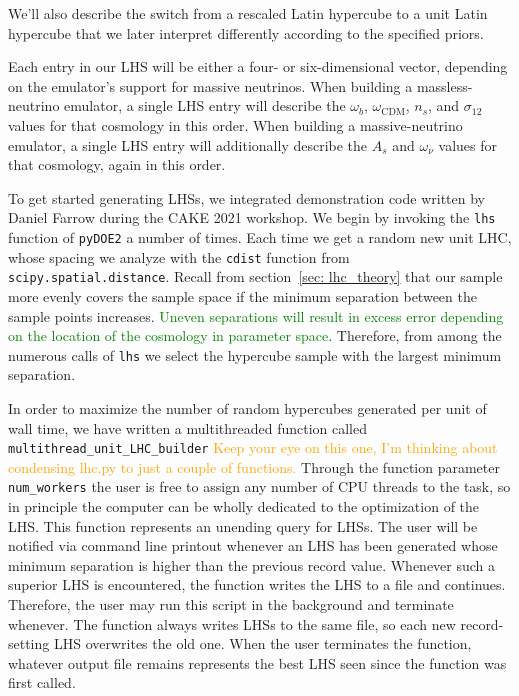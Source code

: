 We'll also describe the switch from a rescaled Latin hypercube to a unit Latin hypercube that we later interpret differently according to the specified priors.

Each entry in our LHS will be either a four- or six-dimensional vector, 
depending on the emulator's support for massive neutrinos. When building a
massless-neutrino emulator, a single LHS entry will describe the $\omega_b$,
$\omega_\text{CDM}$, $n_s$, and $\sigma_{12}$ values for that cosmology in 
this order. When building a massive-neutrino emulator, a single LHS entry will 
additionally describe the $A_s$ and $\omega_\nu$ values for that cosmology, 
again in this order.

To get started generating LHSs, we integrated demonstration code written by 
Daniel Farrow  
during the CAKE 2021 workshop. We begin by invoking the \verb|lhs| function of
\verb|pyDOE2| a number of times. Each time we get a random new unit LHC, whose
spacing we analyze with the \verb|cdist| function from
\verb|scipy.spatial.distance|.  Recall from section~\ref{sec: lhc_theory} that
our sample more evenly covers the sample space if the minimum separation 
between the sample points increases. \textcolor{green}{Uneven separations will
result in excess error depending on the location of the cosmology in parameter
space}. Therefore, from among the numerous calls of \verb|lhs| we select the
hypercube sample with the largest minimum separation.

In order to maximize the number of random hypercubes generated per unit of
wall time, we have written a multithreaded function called
\verb|multithread_unit_LHC_builder| \textcolor{orange}{Keep your eye on this
one, I'm thinking about condensing lhc.py to just a couple of functions.}
Through the function parameter \verb|num_workers| the user is free to assign
any number of CPU threads to the task, so in principle the computer can be
wholly dedicated to the optimization of the LHS. This function represents an
unending query for LHSs. The user will be notified via command
line printout whenever an LHS has been generated whose minimum separation is
higher than the previous record value. Whenever such a superior LHS is
encountered, the function writes the LHS to a file and continues. Therefore,
the user may run this script in the background and terminate whenever. The
function always writes LHSs to the same file, so each new record-setting LHS
overwrites the old one. When the user terminates the function, whatever output
file remains represents the best LHS seen since the function was first called.

